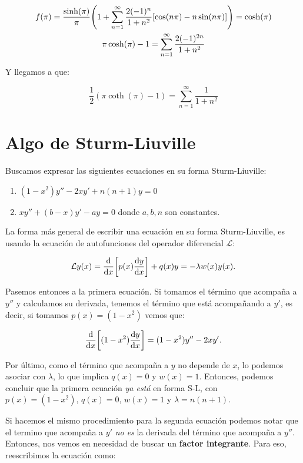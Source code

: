 \documentclass[11pt]{article}
\begin{document}
\begin{gather}
    f(\pi) = \frac{\sinh(\pi)}{\pi} \pqty{1 + \sum_{n=1}^{\infty} \frac{2(-1)^n}{1 + n^2} [\cos(n\pi) - n\sin(n\pi)]} = \cosh(\pi)\\
    \pi\cosh(\pi) - 1 = \sum_{n=1}^{\infty} \frac{2(-1)^{2n}}{1 + n^2}
\end{gather}

Y llegamos a que:

\begin{equation}
    \frac{1}{2} (\pi\coth(\pi)-1) = \sum_{n=1}^{\infty} \frac{1}{1+n^2}
\end{equation}

\section{Algo de Sturm-Liuville}
Buscamos expresar las siguientes ecuaciones en su forma Sturm-Liuville:

\begin{enumerate}
    \item $(1 - x^2)y'' - 2xy' + n(n + 1)y = 0$  
    \item $xy'' + (b - x)y' - ay = 0$ donde $a, b, n$ son constantes.  
\end{enumerate}

La forma más general de escribir una ecuación en su forma Sturm-Liuville, es usando la ecuación de autofunciones del operador diferencial $\mathcal{L}$:

\begin{equation}
    \mathcal{L}y(x) = \dv{x}\bqty{p(x)\dv{y}{x}} + q(x)y = -\lambda w(x)y(x).
\end{equation}

Pasemos entonces a la primera ecuación. Si tomamos el término que acompaña a $y''$ y calculamos su derivada, tenemos el término que está acompañando a $y'$, es decir, si tomamos $p(x) = (1 - x^2)$ vemos que:

\begin{equation}
    \dv{x}\bqty{(1 - x^2)\dv{y}{x}} = (1 - x^2)y'' - 2xy'.
\end{equation}

Por último, como el término que acompaña a $y$ no depende de $x$, lo podemos asociar con $\lambda$, lo que implica $q(x) = 0$ y $w(x) = 1$. Entonces, podemos concluir que la primera ecuación \textit{ya está} en forma S-L, con $p(x) = (1 - x^2),\, q(x) = 0,\, w(x) = 1$ y $\lambda = n(n + 1)$.

Si hacemos el mismo procedimiento para la segunda ecuación podemos notar que el termino que acompaña a $y'$ \textit{no es} la derivada del término que acompaña a $y''$. Entonces, nos vemos en necesidad de buscar un \textbf{factor integrante}. Para eso, reescribimos la ecuación como:
\end{document}
